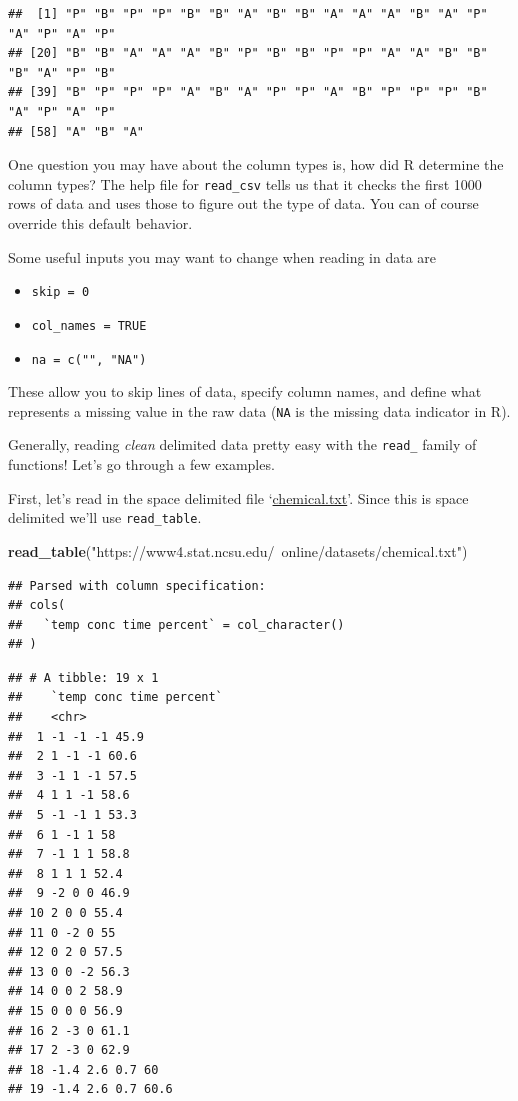 \documentclass[
]{book}
\newenvironment{Shaded}{\begin{snugshade}}{\end{snugshade}}
\newcommand{\KeywordTok}[1]{\textcolor[rgb]{0.13,0.29,0.53}{\textbf{#1}}}
\newcommand{\NormalTok}[1]{#1}
\newcommand{\StringTok}[1]{\textcolor[rgb]{0.31,0.60,0.02}{#1}}
\theoremstyle{definition}
\theoremstyle{definition}
\theoremstyle{definition}
\theoremstyle{remark}
\begin{document}
\begin{verbatim}
##  [1] "P" "B" "P" "P" "B" "B" "A" "B" "B" "A" "A" "A" "B" "A" "P" "A" "P" "A" "P"
## [20] "B" "B" "A" "A" "A" "B" "P" "B" "B" "P" "P" "A" "A" "B" "B" "B" "A" "P" "B"
## [39] "B" "P" "P" "P" "A" "B" "A" "P" "P" "A" "B" "P" "P" "P" "B" "A" "P" "A" "P"
## [58] "A" "B" "A"
\end{verbatim}

One question you may have about the column types is, how did R determine the column types? The help file for \texttt{read\_csv} tells us that it checks the first 1000 rows of data and uses those to figure out the type of data. You can of course override this default behavior.

Some useful inputs you may want to change when reading in data are

\begin{itemize}
\item
  \texttt{skip\ =\ 0}
\item
  \texttt{col\_names\ =\ TRUE}
\item
  \texttt{na\ =\ c("",\ "NA")}
\end{itemize}

These allow you to skip lines of data, specify column names, and define what represents a missing value in the raw data (\texttt{NA} is the missing data indicator in R).

Generally, reading \emph{clean} delimited data pretty easy with the \texttt{read\_} family of functions! Let's go through a few examples.

First, let's read in the space delimited file `\href{https://www4.stat.ncsu.edu/~online/datasets/chemical.txt}{chemical.txt}'. Since this is space delimited we'll use \texttt{read\_table}.

\begin{Shaded}
\begin{Highlighting}[]
\KeywordTok{read_table}\NormalTok{(}\StringTok{"https://www4.stat.ncsu.edu/~online/datasets/chemical.txt"}\NormalTok{)}
\end{Highlighting}
\end{Shaded}

\begin{verbatim}
## Parsed with column specification:
## cols(
##   `temp conc time percent` = col_character()
## )
\end{verbatim}

\begin{verbatim}
## # A tibble: 19 x 1
##    `temp conc time percent`
##    <chr>                   
##  1 -1 -1 -1 45.9           
##  2 1 -1 -1 60.6            
##  3 -1 1 -1 57.5            
##  4 1 1 -1 58.6             
##  5 -1 -1 1 53.3            
##  6 1 -1 1 58               
##  7 -1 1 1 58.8             
##  8 1 1 1 52.4              
##  9 -2 0 0 46.9             
## 10 2 0 0 55.4              
## 11 0 -2 0 55               
## 12 0 2 0 57.5              
## 13 0 0 -2 56.3             
## 14 0 0 2 58.9              
## 15 0 0 0 56.9              
## 16 2 -3 0 61.1             
## 17 2 -3 0 62.9             
## 18 -1.4 2.6 0.7 60         
## 19 -1.4 2.6 0.7 60.6
\end{verbatim}
\end{document}
